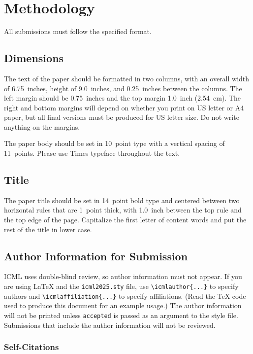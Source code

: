 \documentclass{article}
\theoremstyle{plain}
\theoremstyle{definition}
\theoremstyle{remark}
\begin{document}
\section{Methodology}

All submissions must follow the specified format.

\subsection{Dimensions}




The text of the paper should be formatted in two columns, with an
overall width of 6.75~inches, height of 9.0~inches, and 0.25~inches
between the columns. The left margin should be 0.75~inches and the top
margin 1.0~inch (2.54~cm). The right and bottom margins will depend on
whether you print on US letter or A4 paper, but all final versions
must be produced for US letter size.
Do not write anything on the margins.

The paper body should be set in 10~point type with a vertical spacing
of 11~points. Please use Times typeface throughout the text.

\subsection{Title}

The paper title should be set in 14~point bold type and centered
between two horizontal rules that are 1~point thick, with 1.0~inch
between the top rule and the top edge of the page. Capitalize the
first letter of content words and put the rest of the title in lower
case.

\subsection{Author Information for Submission}
\label{author info}

ICML uses double-blind review, so author information must not appear. If
you are using \LaTeX\/ and the \texttt{icml2025.sty} file, use
\verb+\icmlauthor{...}+ to specify authors and \verb+\icmlaffiliation{...}+ to specify affiliations. (Read the TeX code used to produce this document for an example usage.) The author information
will not be printed unless \texttt{accepted} is passed as an argument to the
style file.
Submissions that include the author information will not
be reviewed.

\subsubsection{Self-Citations}
\end{document}
